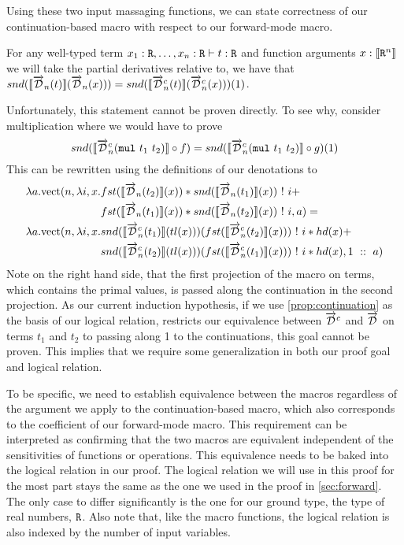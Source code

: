   Using these two input massaging functions, we can state correctness of our continuation-based macro with respect to our forward-mode macro.
  \begin{proposition}\label{prop:continuation}
    For any well-typed term $x_1 : \texttt{R}, \dots, x_n : \texttt{R} \vdash t : \texttt{R}$ and function arguments $x : \llbracket \texttt{R}^n \rrbracket$ we will take the partial derivatives relative to, we have that $snd(\llbracket\overrightarrow{\mathcal{D}}_n(t)\rrbracket (\overrightarrow{\mathcal{D}}_n(x))) = snd(\llbracket\overrightarrow{\mathcal{D}}^c_n(t)\rrbracket (\overrightarrow{\mathcal{D}}^c_n(x)))(1)$.
  \end{proposition}
  Unfortunately, this statement cannot be proven directly.
  To see why, consider multiplication where we would have to prove
  \begin{equation*}
    snd(\llbracket \overrightarrow{\mathcal{D}}^c_n(\texttt{mul}\ t_1\ t_2) \rrbracket \circ f)= snd(\llbracket \overrightarrow{\mathcal{D}}^c_n(\texttt{mul}\ t_1\ t_2) \rrbracket \circ g)(1)
  \end{equation*}
  This can be rewritten using the definitions of our denotations to
  \begin{align*}
    \lambda a. \text{vect}(n, \lambda i, x. &fst(\llbracket \overrightarrow{\mathcal{D}}_n(t_2) \rrbracket(x)) * snd(\llbracket \overrightarrow{\mathcal{D}}_n(t_1)\rrbracket(x))\ !\ i + \\
      &fst(\llbracket \overrightarrow{\mathcal{D}}_n(t_1) \rrbracket(x)) * snd(\llbracket \overrightarrow{\mathcal{D}}_n(t_2)\rrbracket(x))\ !\ i, a) = \\
    \lambda a. \text{vect}(n, \lambda i, x. &snd(\llbracket \overrightarrow{\mathcal{D}}^c_n(t_1) \rrbracket(tl(x)))(fst(\llbracket \overrightarrow{\mathcal{D}}^c_n(t_2)\rrbracket(x)))\ !\ i * hd(x) + \\
    &snd(\llbracket \overrightarrow{\mathcal{D}}^c_n(t_2) \rrbracket(tl(x)))(fst(\llbracket \overrightarrow{\mathcal{D}}^c_n(t_1)\rrbracket(x)))\ !\ i * hd(x), 1\ ::\ a)
  \end{align*}
  Note on the right hand side, that the first projection of the macro on terms, which contains the primal values, is passed along the continuation in the second projection.
  As our current induction hypothesis, if we use \cref{prop:continuation} as the basis of our logical relation, restricts our equivalence between $\overrightarrow{\mathcal{D}}^c$ and $\overrightarrow{\mathcal{D}}$ on terms $t_1$ and $t_2$ to passing along 1 to the continuations, this goal cannot be proven.
  This implies that we require some generalization in both our proof goal and logical relation.

  To be specific, we need to establish equivalence between the macros regardless of the argument we apply to the continuation-based macro, which also corresponds to the coefficient of our forward-mode macro.
  This requirement can be interpreted as confirming that the two macros are equivalent independent of the sensitivities of functions or operations.
  This equivalence needs to be baked into the logical relation in our proof.
  The logical relation we will use in this proof for the most part stays the same as the one we used in the proof in \cref{sec:forward}.
  The only case to differ significantly is the one for our ground type, the type of real numbers, $\texttt{R}$.
  Also note that, like the macro functions, the logical relation is also indexed by the number of input variables.

